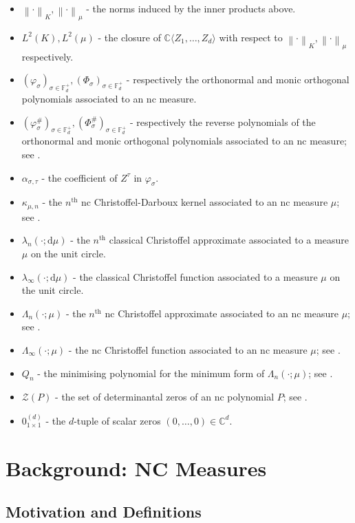 \documentclass[11pt,reqno]{amsart}
\newcommand\norm[1]{\left\lVert#1\right\rVert}
\def\a{\alpha}
\def\p{\varphi}
\def\l{\lambda}
\def\k{\kappa}
\def\s{\sigma}
\def\t{\tau}
\def\L{\Lambda}
\def\P{\Phi}
\def\rmd{\mathrm{d}}
\def\CC{\mathbb{C}}
\def\FF{\mathbb{F}}
\def\cZ{\mathcal{Z}}
\theoremstyle{definition}
\numberwithin{equation}{section}
\begin{document}
\begin{itemize}
    \item \(\norm{\cdot}_K, \norm{\cdot}_\mu\) - the norms induced by the inner products above.
    \item \(L^2(K), L^2(\mu)\) - the closure of \(\CC\langle Z_1, \ldots, Z_d\rangle\) with respect to \(\norm{\cdot}_K, \norm{\cdot}_\mu\) respectively.
    \item \((\p_\s)_{\s \in \FF_d^+}, (\P_\s)_{\s\in\FF_d^+}\) - respectively the orthonormal and monic orthogonal polynomials associated to an nc measure.
    \item \((\p_\s^{\#})_{\s \in \FF_d^+}, (\P_\s^{\#})_{\s\in\FF_d^+}\) - respectively the reverse polynomials of the orthonormal and monic orthogonal polynomials associated to an nc measure; see .
    \item \(\a_{\s,\t}\) - the coefficient of \(Z^\t\) in \(\p_\s\).
    \item \(\k_{\mu,n}\) - the \(n^{\text{th}}\) nc Christoffel-Darboux kernel associated to an nc measure \(\mu\); see .
    \item \(\l_n(\cdot; \rmd \mu)\) - the \(n^{\text{th}}\) classical Christoffel approximate associated to a measure \(\mu\) on the unit circle.
    \item \(\l_{\infty}(\cdot; \rmd \mu)\) - the classical Christoffel function associated to a measure \(\mu\) on the unit circle.
    \item \(\L_n(\cdot; \mu)\) - the \(n^{\text{th}}\) nc Christoffel approximate associated to an nc measure \(\mu\); see . 
    \item \(\L_\infty(\cdot; \mu)\) - the nc Christoffel function associated to an nc measure \(\mu\); see .
    \item \(Q_n\) - the minimising polynomial for the minimum form of \(\L_n(\cdot; \mu)\); see .
    \item \(\cZ(P)\) - the set of determinantal zeros of an nc polynomial \(P\); see .
    \item \(0^{(d)}_{1\times1}\) - the \(d\)-tuple of scalar zeros \((0, \ldots, 0) \in \CC^d\).
\end{itemize}

\section{Background: NC Measures}

\subsection{Motivation and Definitions}
\end{document}
